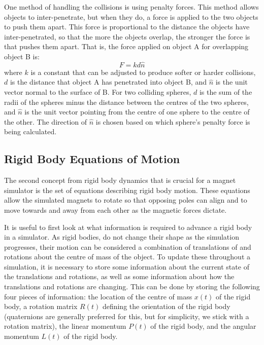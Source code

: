 \documentclass[tog]{acmsiggraph}
\begin{document}
One method of handling the collisions is using penalty forces. This method allows objects to inter-penetrate, but when they do, a force is applied to the two objects to push them apart. This force is proportional to the distance the objects have inter-penetrated, so that the more the objects overlap, the stronger the force is that pushes them apart. That is, the force applied on object A for overlapping object B is:
\begin{equation}
 F = kd\hat{n}
\end{equation}
where $k$ is a constant that can be adjusted to produce softer or harder collisions, $d$ is the distance that object A has penetrated into object B, and $\hat{n}$ is the unit vector normal to the surface of B. For two colliding spheres, $d$ is the sum of the radii of the spheres minus the distance between the centres of the two spheres, and $\hat{n}$ is the unit vector pointing from the centre of one sphere to the centre of the other. The direction of $\hat{n}$ is chosen based on which sphere's penalty force is being calculated.

\subsection{Rigid Body Equations of Motion}

The second concept from rigid body dynamics that is crucial for a magnet simulator is the set of equations describing rigid body motion. These equations allow the simulated magnets to rotate so that opposing poles can align and to move towards and away from each other as the magnetic forces dictate.

It is useful to first look at what information is required to advance a rigid body in a simulator. As rigid bodies, do not change their shape as the simulation progresses, their motion can be considered a combination of translations of and rotations about the centre of mass of the object. To update these throughout a simulation, it is necessary to store some information about the current state of the translations and rotations, as well as some information about how the translations and rotations are changing. This can be done by storing the following four pieces of information: the location of the centre of mass $x(t)$ of the rigid body, a rotation matrix $R(t)$ defining the orientation of the rigid body (quaternions are generally preferred for this, but for simplicity, we stick with a rotation matrix), the linear momentum $P(t)$ of the rigid body, and the angular momentum $L(t)$ of the rigid body.
\end{document}
